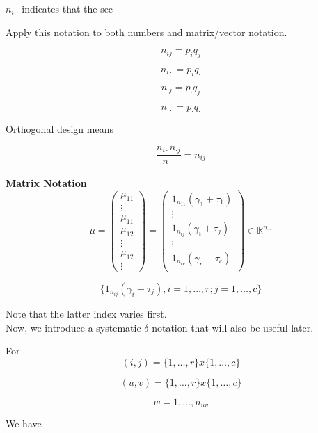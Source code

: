 \documentclass[11pt,fleqn]{book} %
\begin{document}
\begin{notation}
	$n_{i\cdot} $ indicates that the sec
\end{notation}

Apply this notation to both numbers and matrix/vector notation. 

	$$n_{ij} = p_i q_j $$

	$$n_{i\cdot} = p_i q_\cdot $$

	$$ n_{\cdot j} = p_\cdot q_j $$

	$$ n_{\cdot \cdot} = p_\cdot q_\cdot $$

	

Orthogonal design means

		$$\frac{n_{i\cdot}n_{\cdot j}}{n_{\cdot \cdot}} = n_{ij} $$


\textbf{Matrix Notation}\\

		$$ \mu = \begin{pmatrix}
			\mu_{11}\\
			\vdots \\
			\mu_{11}\\
			\mu_{12}\\
			\vdots \\
			\mu_{12}\\
			\vdots
		\end{pmatrix} = \begin{pmatrix}
			1_{n_{11}} (\gamma_1 + \tau_1)\\
			\vdots\\
			1_{n_{ij}} (\gamma_i + \tau_j)\\
			\vdots\\
			1_{n_{rc}} (\gamma_r + \tau_c)\\
		\end{pmatrix} \in \mathbb{R}^{n_{\cdot \cdot}}$$

			$$\{1_{n_{ij}} (\gamma_i  + \tau_j), i = 1, \dots, r; j = 1, \dots, c \} $$

Note that the latter index varies first. \\

Now, we introduce a systematic $\delta$ notation that will also be useful later. 


\begin{notation}
	For 
			$$(i,j) = \{1, \dots, r \} x \{1, \dots, c \} $$

			$$(u,v) = \{1, \dots, r \} x \{1, \dots, c \} $$

			$$w = 1, \dots, n_{uv} $$


	We have


\end{notation}
\end{document}

